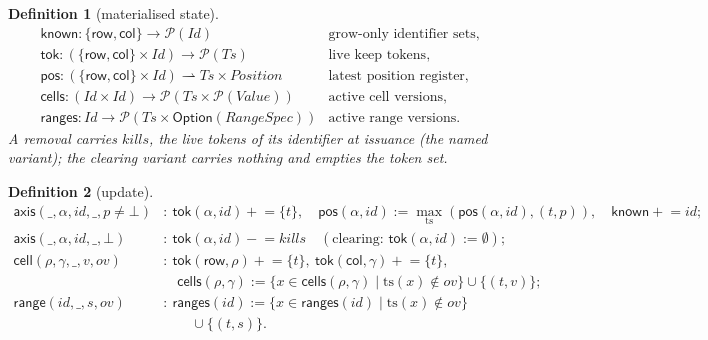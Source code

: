 \documentclass[11pt]{article}
\newtheorem{definition}{Definition}[section]
\newcommand{\tok}{\mathsf{tok}}
\newcommand{\pos}{\mathsf{pos}}
\newcommand{\cells}{\mathsf{cells}}
\newcommand{\ranges}{\mathsf{ranges}}
\newcommand{\Row}{\mathsf{row}}
\newcommand{\Col}{\mathsf{col}}
\begin{document}
\begin{definition}[materialised state]
\[
\begin{array}{ll}
\mathsf{known}:\{\Row,\Col\}\to\mathcal P(\mathit{Id}) & \text{grow-only identifier sets},\\
\tok:(\{\Row,\Col\}\times\mathit{Id})\to\mathcal P(\mathit{Ts}) & \text{live keep tokens},\\
\pos:(\{\Row,\Col\}\times\mathit{Id})\rightharpoonup\mathit{Ts}\times\mathit{Position} & \text{latest position register},\\
\cells:(\mathit{Id}\times\mathit{Id})\to\mathcal P(\mathit{Ts}\times\mathcal P(\mathit{Value})) & \text{active cell versions},\\
\ranges:\mathit{Id}\to\mathcal P(\mathit{Ts}\times\mathsf{Option}(\mathit{RangeSpec})) & \text{active range versions}.
\end{array}
\]
A removal carries $\mathit{kills}$, the live tokens of its identifier at
issuance (the \emph{named} variant); the \emph{clearing} variant carries
nothing and empties the token set.
\end{definition}

\begin{definition}[update]
\[
\begin{aligned}
\mathsf{axis}(\_,\alpha,\mathit{id},\_,p\neq\bot)&:\ \tok(\alpha,\mathit{id})\mathrel{+}=\{t\},\quad
 \pos(\alpha,\mathit{id}):=\max_{\mathrm{ts}}(\pos(\alpha,\mathit{id}),(t,p)),\quad \mathsf{known}\mathrel{+}=\mathit{id};\\
\mathsf{axis}(\_,\alpha,\mathit{id},\_,\bot)&:\ \tok(\alpha,\mathit{id})\mathrel{-}=\mathit{kills}
 \quad(\text{clearing: }\tok(\alpha,\mathit{id}):=\emptyset);\\
\mathsf{cell}(\rho,\gamma,\_,v,\mathit{ov})&:\ \tok(\Row,\rho)\mathrel{+}=\{t\},\ \tok(\Col,\gamma)\mathrel{+}=\{t\},\\
 &\quad\cells(\rho,\gamma):=\{x\in\cells(\rho,\gamma)\mid \mathrm{ts}(x)\notin\mathit{ov}\}\cup\{(t,v)\};\\
\mathsf{range}(\mathit{id},\_,s,\mathit{ov})&:\ \ranges(\mathit{id}):=\{x\in\ranges(\mathit{id})\mid\mathrm{ts}(x)\notin\mathit{ov}\}\\
 &\qquad\cup\{(t,s)\}.
\end{aligned}
\]
\end{definition}
\end{document}
